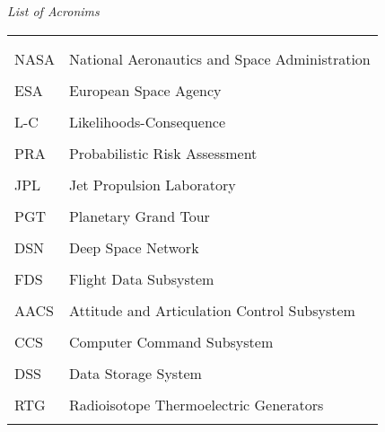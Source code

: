 \clearpage

\begin{table}[h]
    {\huge \textit{List of Acronims}}
    \begin{center}
        \begin{tabular}{ L{4cm} L{10cm}}
             \\ \\ \\
            NASA & National Aeronautics and Space Administration \\ \\
            
            ESA & European Space Agency \\ \\
            
            L-C & Likelihoods-Consequence \\ \\
            
            PRA & Probabilistic Risk Assessment \\ \\
            
            JPL & Jet Propulsion Laboratory \\ \\
            
            PGT & Planetary Grand Tour \\ \\
            
            DSN & Deep Space Network \\ \\
            
            FDS & Flight Data Subsystem \\ \\
            
            AACS & Attitude and Articulation Control Subsystem \\ \\
            
            CCS & Computer Command Subsystem \\ \\
            
            DSS & Data Storage System \\ \\
            
            RTG & Radioisotope Thermoelectric Generators \\ \\
            

\end{tabular}
\end{center}
\end{table}
